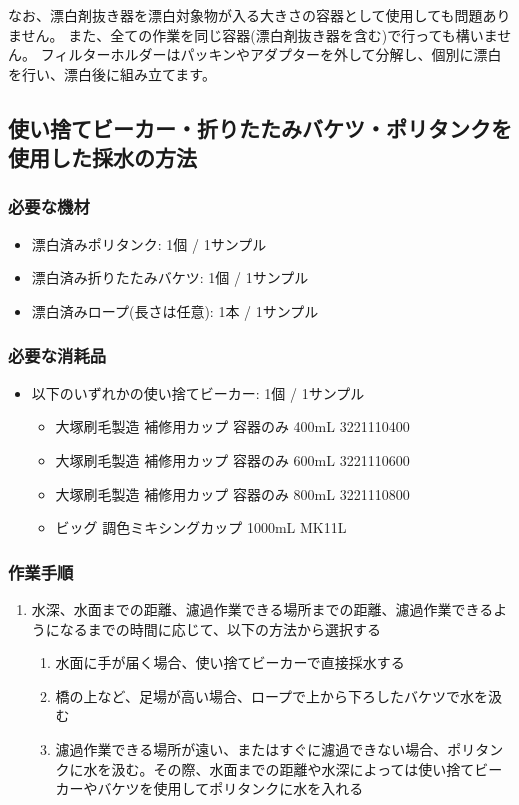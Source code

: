 \documentclass[titlepage,10pt,a4paper,uplatex]{jsbook}
\begin{document}
なお、漂白剤抜き器を漂白対象物が入る大きさの容器として使用しても問題ありません。
また、全ての作業を同じ容器(漂白剤抜き器を含む)で行っても構いません。
フィルターホルダーはパッキンやアダプターを外して分解し、個別に漂白を行い、漂白後に組み立てます。

\subsection{使い捨てビーカー・折りたたみバケツ・ポリタンクを使用した採水の方法}

\subsubsection{必要な機材}
\begin{itemize}
\item 漂白済みポリタンク: 1個 / 1サンプル
\item 漂白済み折りたたみバケツ: 1個 / 1サンプル
\item 漂白済みロープ(長さは任意): 1本 / 1サンプル
\end{itemize}

\subsubsection{必要な消耗品}
\begin{itemize}
\item 以下のいずれかの使い捨てビーカー: 1個 / 1サンプル
\begin{itemize}
\item 大塚刷毛製造 補修用カップ 容器のみ 400mL 3221110400
\item 大塚刷毛製造 補修用カップ 容器のみ 600mL 3221110600
\item 大塚刷毛製造 補修用カップ 容器のみ 800mL 3221110800
\item ビッグ 調色ミキシングカップ 1000mL MK11L
\end{itemize}
\end{itemize}

\subsubsection{作業手順}
\begin{enumerate}
\item 水深、水面までの距離、濾過作業できる場所までの距離、濾過作業できるようになるまでの時間に応じて、以下の方法から選択する
\begin{enumerate}
\item 水面に手が届く場合、使い捨てビーカーで直接採水する
\item 橋の上など、足場が高い場合、ロープで上から下ろしたバケツで水を汲む
\item 濾過作業できる場所が遠い、またはすぐに濾過できない場合、ポリタンクに水を汲む。その際、水面までの距離や水深によっては使い捨てビーカーやバケツを使用してポリタンクに水を入れる
\end{enumerate}
\end{enumerate}
\end{document}
